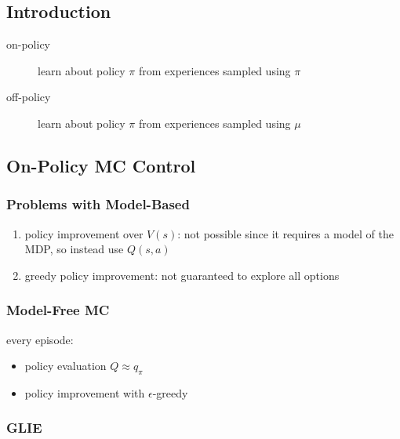 \documentclass[]{article}
\theoremstyle{definition}
\begin{document}
\subsection{Introduction}%
\label{sub:mc_introduction}

\begin{description}
    \item[on-policy] learn about policy $\pi$ from experiences sampled using $\pi$
    \item[off-policy] learn about policy $\pi$ from experiences sampled using $\mu$
\end{description}

\subsection{On-Policy MC Control}%
\label{sub:on_policy_mc_control}

\subsubsection{Problems with Model-Based}%
\label{ssub:problems_with_model_based}
\begin{enumerate}
    \item policy improvement over $V(s)$: not possible since it requires a model of the MDP, so instead use $Q(s,a)$
    \item greedy policy improvement: not guaranteed to explore all options
\end{enumerate}

\subsubsection{Model-Free MC}%
\label{ssub:model_free_mc}
every episode:
\begin{itemize}
    \item policy evaluation $Q \approx q_\pi$
    \item policy improvement with $\epsilon$-greedy
\end{itemize}

\subsubsection{GLIE}%
\label{ssub:glie}
\end{document}
